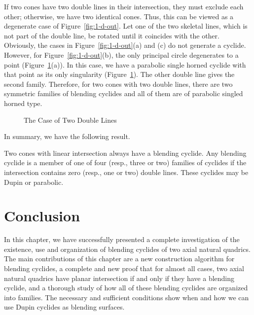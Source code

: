      If two cones have two double lines in their intersection, they must
exclude each other; otherwise, we have two identical cones.  Thus, this can be
viewed as a degenerate case of Figure~\ref{fig:1-d-out}.  Let one of the two
skeletal lines, which is not part of the double line, be rotated until it
coincides with the other.  Obviously, the cases in Figure~\ref{fig:1-d-out}(a)
and (c) do not generate a cyclide.  However, for Figure~\ref{fig:1-d-out}(b), 
the only principal circle degenerates to a point (Figure~\ref{fig:2-d}(a)).  
In this case, we have a parabolic single horned cyclide with that point 
as its only singularity (Figure~\ref{fig:2-d}).  
The other double line gives the second family.  
Therefore, for two cones with two double lines, there are two symmetric
families of blending cyclides and all of them are of 
parabolic singled horned type.
\begin{figure}
\vspace{4cm}
\caption{The Case of Two Double Lines}
\label{fig:2-d}
\end{figure}

     In summary, we have the following result.

\begin{theorem}
\label{thm:linear-inter-blending}
     Two cones with linear intersection always have a blending cyclide.
Any blending cyclide is a member of one of four (resp., three or two) families
of cyclides if the intersection contains zero (resp., one or two) double
lines.  These cyclides may be Dupin or parabolic.
\end{theorem}


\section{Conclusion}
\label{section:cyc-concl}

     In this chapter, we have successfully presented a complete investigation
of the existence, use and organization of blending cyclides of two axial
natural quadrics.  The main contributions of this chapter are a new 
construction algorithm for blending cyclides, a complete and new proof that 
for almost all cases, two axial natural quadrics have planar intersection 
if and only if they have a blending cyclide, and a thorough study of how all 
of these blending cyclides are organized into families.
The necessary and sufficient conditions show
when and how we can use Dupin cyclides as blending surfaces.

